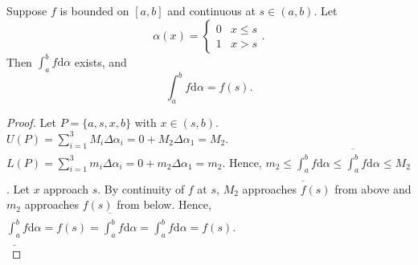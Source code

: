 \begin{thm}[15]
	Suppose $f$ is bounded on $[a,b]$ and continuous at $s \in (a,b)$.
	Let \[
		\alpha(x)=\begin{cases}
			0 & x\le s \\
			1 & x>s
		\end{cases}
		.\]
	Then $\int_{a}^{b}{f\mathrm{d}\alpha}$ exists, and
	\[
		\int_{a}^{b}{f\mathrm{d}\alpha}=f (s).
	\]
	\begin{proof}
		Let $P=\{a,s,x,b\}$ with $x \in (s,b)$.
		$U(P)=\sum_{i=1}^{3}{M_i \Delta \alpha_i}=0+M_2 \Delta \alpha_1=M_2$.
		$L(P)=\sum_{i=1}^{3}{m_i \Delta \alpha_i}=0+m_2 \Delta \alpha_1=m_2$.
		Hence, $m_2 \le \underline{\int_{a}^{b}}{f\mathrm{d}\alpha}\le \overline{\int_{a}^{b}}{f\mathrm{d}\alpha}\le M_2$.
		Let $x$ approach $s$.
		By continuity of $f$ at $s$, $M_2$ approaches $f(s)$ from above and $m_2$ approaches $f(s)$ from below. Hence, $\underline{\int_{a}^{b}}{f\mathrm{d}\alpha}= f(s)= \overline{\int_{a}^{b}}{f\mathrm{d}\alpha}= \int_{a}^{b}{f\mathrm{d}\alpha}=f(s)$.\\
\end{proof}
\end{thm}
